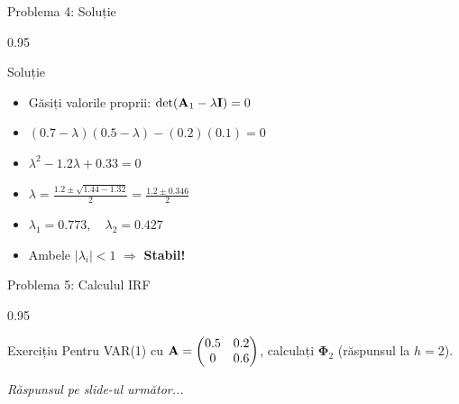 \documentclass[9pt, aspectratio=169, t]{beamer}
\begin{document}
\begin{frame}{Problema 4: Soluție}
    \begin{cminipage}{0.95\textwidth}
    \begin{exampleblock}{Soluție}
        \begin{itemize}\setlength{\itemsep}{0pt}
            \item Găsiți valorile proprii: $\det(\mathbf{A}_1 - \lambda \mathbf{I}) = 0$
            \item $(0.7 - \lambda)(0.5 - \lambda) - (0.2)(0.1) = 0$
            \item $\lambda^2 - 1.2\lambda + 0.33 = 0$
            \item $\lambda = \frac{1.2 \pm \sqrt{1.44 - 1.32}}{2} = \frac{1.2 \pm 0.346}{2}$
            \item $\lambda_1 = 0.773, \quad \lambda_2 = 0.427$
            \item Ambele $|\lambda_i| < 1$ $\Rightarrow$ \textbf{Stabil!}
        \end{itemize}
    \end{exampleblock}
    \end{cminipage}
\end{frame}

\begin{frame}{Problema 5: Calculul IRF}
    \begin{cminipage}{0.95\textwidth}
    \begin{block}{Exercițiu}
        Pentru VAR(1) cu $\mathbf{A} = \begin{pmatrix} 0.5 & 0.2 \\ 0 & 0.6 \end{pmatrix}$, calculați $\boldsymbol{\Phi}_2$ (răspunsul la $h=2$).
    \end{block}

    \vspace{0.5cm}
    \begin{flushright}\textit{Răspunsul pe slide-ul următor...}\end{flushright}
    \end{cminipage}
\end{frame}
\end{document}

